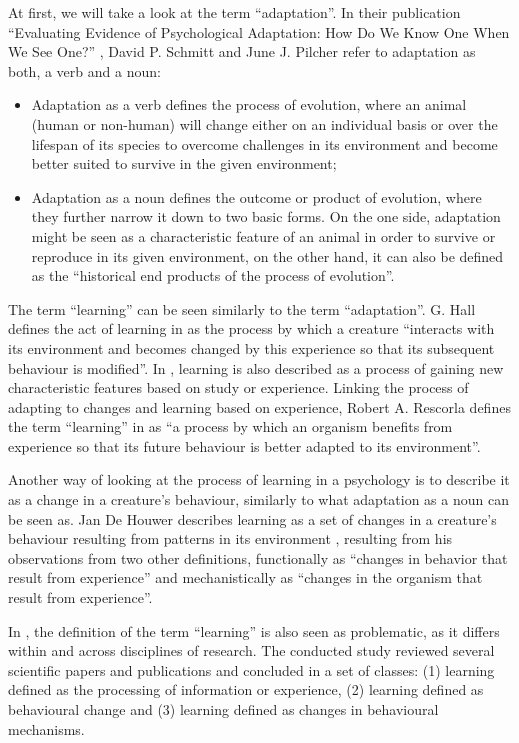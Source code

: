 \documentclass[conference]{IEEEtran}
\begin{document}
	At first, we will take a look at the term “adaptation”. In their publication “Evaluating Evidence of Psychological Adaptation: How Do We Know One When We See One?” \cite{b1}, David P. Schmitt and June J. Pilcher refer to adaptation as both, a verb and a noun:
	\begin{itemize}
		\item Adaptation as a verb defines the process of evolution, where an animal (human or non-human) will change either on an individual basis or over the lifespan of its species to overcome challenges in its environment and become better suited to survive in the given environment;
		\item Adaptation as a noun defines the outcome or product of evolution, where they further narrow it down to two basic forms. On the one side, adaptation might be seen as a characteristic feature of an animal in order to survive or reproduce in its given environment, on the other hand, it can also be defined as the “historical end products of the process of evolution”.
	\end{itemize}

	The term “learning” can be seen similarly to the term “adaptation”. G. Hall defines the act of learning in \cite{b2} as the process by which a creature “interacts with its environment and becomes changed by this experience so that its subsequent behaviour is modified”. In \cite{b3}, learning is also described as a process of gaining new characteristic features based on study or experience. Linking the process of adapting to changes and learning based on experience, Robert A. Rescorla defines the term “learning” in \cite{b4} as “a process by which an organism benefits from experience so that its future behaviour is better adapted to its environment”.

	Another way of looking at the process of learning in a psychology is to describe it as a change in a creature’s behaviour, similarly to what adaptation as a noun can be seen as. Jan De Houwer describes learning as a set of changes in a creature’s behaviour resulting from patterns in its environment \cite{b5}, resulting from his observations from two other definitions, functionally as “changes in behavior that result from experience” and mechanistically as “changes in the organism that result from experience”.

	In \cite{b6}, the definition of the term “learning” is also seen as problematic, as it differs within and across disciplines of research. The conducted study reviewed several scientific papers and publications and concluded in a set of classes: (1) learning defined as the processing of information or experience, (2) learning defined as behavioural change and (3) learning defined as changes in behavioural mechanisms.
\end{document}
